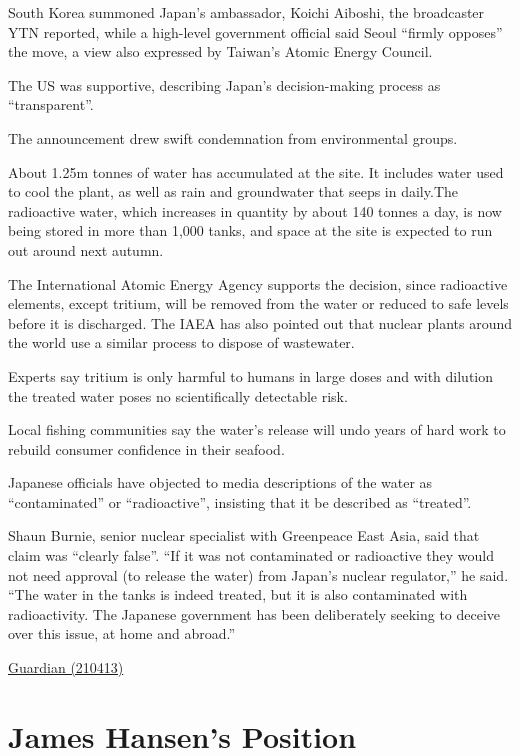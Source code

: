 \documentclass[
]{book}
\begin{document}
South Korea summoned Japan's ambassador, Koichi Aiboshi, the broadcaster YTN reported, while a high-level government official said Seoul ``firmly opposes'' the move, a view also expressed by Taiwan's Atomic Energy Council.

The US was supportive, describing Japan's decision-making process as ``transparent''.

The announcement drew swift condemnation from environmental groups.

About 1.25m tonnes of water has accumulated at the site.
It includes water used to cool the plant, as well as rain and groundwater that seeps in daily.The radioactive water, which increases in quantity by about 140 tonnes a day, is now being stored in more than 1,000 tanks, and space at the site is expected to run out around next autumn.

The International Atomic Energy Agency supports the decision, since radioactive elements, except tritium, will be removed from the water or reduced to safe levels before it is discharged. The IAEA has also pointed out that nuclear plants around the world use a similar process to dispose of wastewater.

Experts say tritium is only harmful to humans in large doses and with dilution the treated water poses no scientifically detectable risk.

Local fishing communities say the water's release will undo years of hard work to rebuild consumer confidence in their seafood.

Japanese officials have objected to media descriptions of the water as ``contaminated'' or ``radioactive'', insisting that it be described as ``treated''.

Shaun Burnie, senior nuclear specialist with Greenpeace East Asia, said that claim was ``clearly false''.
``If it was not contaminated or radioactive they would not need approval (to release the water) from Japan's nuclear regulator,'' he said. ``The water in the tanks is indeed treated, but it is also contaminated with radioactivity. The Japanese government has been deliberately seeking to deceive over this issue, at home and abroad.''

\href{https://www.theguardian.com/environment/2021/apr/13/fukushima-japan-to-start-dumping-contaminated-water-pacific-ocean}{Guardian (210413)}

\hypertarget{james-hansens-position}{%
\section{James Hansen's Position}\label{james-hansens-position}}
\end{document}
